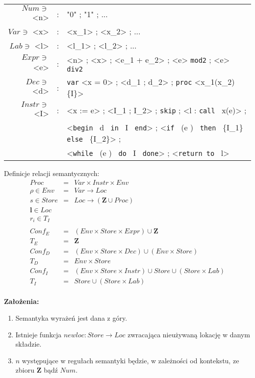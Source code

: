 \documentclass[a4paper,11pt]{article}
\begin{document}
\begin{grammar}
  [(colon){$::=$}]
  [(period){.}]
  [(semicolon){$|$}]
  [(quote){\begin{bf}}{\end{bf}}]
  [(nonterminal){$}{$}]
\begin{tabular}{ r c l }
  $Num \ni$ <n> & : &  "0" ; "1" ; ... \\
  $Var \ni$ <x> & : & <x_1> ; <x_2> ; ... \\
  $Lab \ni$ <l> & : & <l_1> ; <l_2> ; ... \\
  $Expr \ni$ <e> & : & <n> ; <x> ; <e_1 + e_2> ; <e> \texttt{mod2} ; <e> \texttt{div2} \\
  $Dec \ni$ <d> & : & \texttt{var} <x = 0> ; <d_1 ; d_2> ; \texttt{proc} <x_1(x_2)\{I\}> \\
  $Instr \ni$ <I> & : & <x := e> ; <I_1 ; I_2> ; \texttt{skip} ; <l : \texttt{call } x(e)> ; \\
	& & <\texttt{begin } d \texttt{ in } I \texttt{ end}> ;
	<\texttt{if } (e \lessthan\greaterthan  0) \texttt{ then } \{I_1\} \texttt{ else } \{I_2\}> ; \\
	& & <\texttt{while } (e \lessthan\greaterthan 0) \texttt{ do } I \texttt{ done}> ;
	<\texttt{return to } l>
\end{tabular}
\end{grammar}

Definicje relacji semantycznych: 
\begin{eqnarray*}
Proc & = & Var \times Instr \times Env \\
\rho \in Env & = & Var \to Loc \\
s \in Store & = & Loc \to (\mathbf{Z} \cup Proc) \\
\mathbf{l} \in Loc & & \\
r_i \in T_I & & \\
\\
Conf_E & = & (Env \times Store \times Expr) \cup \mathbf{Z} \\
T_E & = & \mathbf{Z} \\
Conf_D & = & (Env \times Store \times Dec) \cup (Env \times Store) \\
T_D & = & Env \times Store \\
Conf_I & = & (Env \times Store \times Instr) \cup Store \cup (Store \times Lab) \\
T_I & = & Store \cup (Store \times Lab) \\
\end{eqnarray*}

{\bf Założenia:} \\
\begin{enumerate}
  \item{Semantyka wyrażeń jest dana z góry.}
  \item{Istnieje funkcja $newloc : Store \to Loc$ zwracająca nieużywaną lokację w danym składzie.}
  \item{$n$ występujące w regułach semantyki będzie, w zależności od kontekstu, ze zbioru $\mathbf{Z}$ bądź $Num$.}
\end{enumerate}
\end{document}
